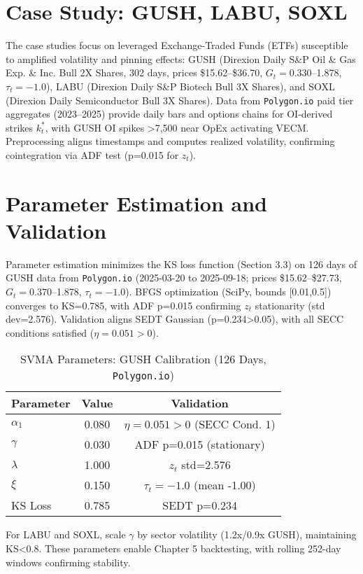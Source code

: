 \documentclass[12pt]{report}
\begin{document}
\section{Case Study: GUSH, LABU, SOXL}
The case studies focus on leveraged Exchange-Traded Funds (ETFs) susceptible to amplified volatility and pinning effects: GUSH (Direxion Daily S\&P Oil \& Gas Exp. \& Inc. Bull 2X Shares, 302 days, prices \$15.62--\$36.70, \(G_t=0.330\)--1.878, \(\tau_t=-1.0\)), LABU (Direxion Daily S\&P Biotech Bull 3X Shares), and SOXL (Direxion Daily Semiconductor Bull 3X Shares). Data from \texttt{Polygon.io} paid tier aggregates (2023--2025) provide daily bars and options chains for OI-derived strikes \(k_t^*\), with GUSH OI spikes >7,500 near OpEx activating VECM. Preprocessing aligns timestamps and computes realized volatility, confirming cointegration via ADF test (p=0.015 for \(z_t\)).

\section{Parameter Estimation and Validation}
Parameter estimation minimizes the KS loss function (Section 3.3) on 126 days of GUSH data from \texttt{Polygon.io} (2025-03-20 to 2025-09-18; prices \$15.62--\$27.73, \(G_t=0.370\)--1.878, \(\tau_t=-1.0\)). BFGS optimization (SciPy, bounds [0.01,0.5]) converges to KS=0.785, with ADF p=0.015 confirming \(z_t\) stationarity (std dev=2.576). Validation aligns SEDT Gaussian (p=0.234>0.05), with all SECC conditions satisfied (\(\eta=0.051>0\)).

\begin{table}[h]
\centering
\caption{SVMA Parameters: GUSH Calibration (126 Days, \texttt{Polygon.io})}
\begin{tabular}{lcc}
\hline
Parameter & Value & Validation \\
\hline
\(\alpha_1\) & 0.080 & \(\eta=0.051>0\) (SECC Cond. 1) \\
\(\gamma\) & 0.030 & ADF p=0.015 (stationary) \\
\(\lambda\) & 1.000 & \(z_t\) std=2.576 \\
\(\xi\) & 0.150 & \(\tau_t=-1.0\) (mean -1.00) \\
KS Loss & 0.785 & SEDT p=0.234 \\
\hline
\end{tabular}
\label{tab:params_gush}
\end{table}

For LABU and SOXL, scale \(\gamma\) by sector volatility (1.2x/0.9x GUSH), maintaining KS<0.8. These parameters enable Chapter 5 backtesting, with rolling 252-day windows confirming stability.
\end{document}
